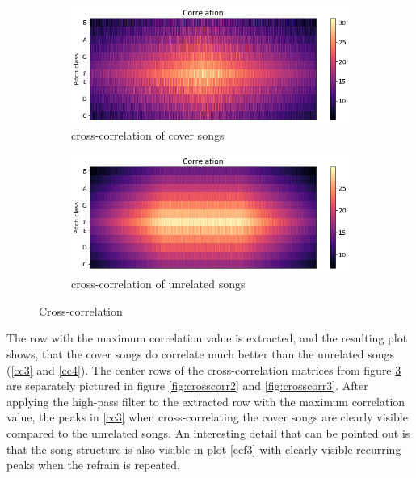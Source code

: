 \begin{figure}[htbp]
{{			\begin{subfigure}{.495\textwidth}
				\centering    
				\includegraphics[scale=0.3]{Images/Chroma/cross_hurricane.png}
				\caption{cross-correlation of cover songs}
				\label{cc1}
			\end{subfigure}		
			\begin{subfigure}{.495\textwidth}
				\centering     
				\includegraphics[scale=0.3]{Images/Chroma/cross_hurricane_sia.png}
				\caption{cross-correlation of unrelated songs}
				\label{cc2}
			\end{subfigure}%
	}}
	\caption{Cross-correlation}
	\label{fig:crosscorr}
\end{figure}
The row with the maximum correlation value is extracted, and the resulting plot shows, that the cover songs do correlate much better than the unrelated songs (\ref{cc3} and \ref{cc4}).
The center rows of the cross-correlation matrices from figure \ref{fig:crosscorr} are separately pictured in figure \ref{fig:crosscorr2} and \ref{fig:crosscorr3}. After applying the high-pass filter to the extracted row with the maximum correlation value, the peaks in \ref{cc3} when cross-correlating the cover songs are clearly visible compared to the unrelated songs. An interesting detail that can be pointed out is that the song structure is also visible in plot \ref{ccf3} with clearly visible recurring peaks when the refrain is repeated.
